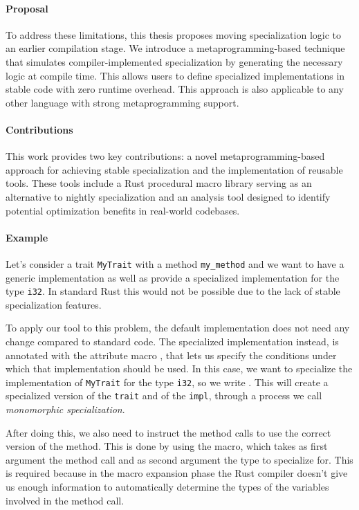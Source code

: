 \paragraph{Proposal}
To address these limitations, this thesis proposes moving specialization logic to an earlier compilation stage.
We introduce a metaprogramming-based technique that simulates compiler-implemented specialization by generating the necessary logic at compile time.
This allows users to define specialized implementations in stable code with zero runtime overhead.
This approach is also applicable to any other language with strong metaprogramming support.

\paragraph{Contributions}
This work provides two key contributions: a novel metaprogramming-based approach for achieving stable specialization and the implementation of reusable tools.
These tools include a Rust procedural macro library serving as an alternative to nightly specialization and an analysis tool designed to identify potential optimization benefits in real-world codebases.

\paragraph{Example}
Let's consider a trait \texttt{MyTrait} with a method \texttt{my\_method} and we want to have a generic implementation as well as provide a specialized implementation for the type \texttt{i32}.
In standard Rust this would not be possible due to the lack of stable specialization features.

To apply our tool to this problem, the default implementation does not need any change compared to standard code.
The specialized implementation instead, is annotated with the attribute macro \inlinerust{#[when(...)]}, that lets us specify the conditions under which that implementation should be used.
In this case, we want to specialize the implementation of \texttt{MyTrait} for the type \texttt{i32}, so we write \inlinerust{#[when(T = i32)]}.
This will create a specialized version of the \texttt{trait} and of the \texttt{impl}, through a process we call \textit{monomorphic specialization}.

After doing this, we also need to instruct the method calls to use the correct version of the method.
This is done by using the  macro, which takes as first argument the method call and as second argument the type to specialize for.
This is required because in the macro expansion phase the Rust compiler doesn't give us enough information to automatically determine the types of the variables involved in the method call.


